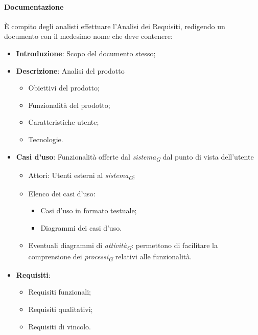 \paragraph{Documentazione}
È compito degli analisti effettuare l'Analisi dei Requisiti, redigendo un documento con il
medesimo nome che deve contenere:
\begin{itemize}
    \item \textbf{Introduzione}: Scopo del documento stesso;
    \item \textbf{Descrizione}: Analisi del prodotto
          \begin{itemize}
              \item Obiettivi del prodotto;
              \item Funzionalità del prodotto;
              \item Caratteristiche utente;
              \item Tecnologie.
          \end{itemize}
    \item \textbf{Casi d'uso}: Funzionalità offerte dal \textit{sistema}\textsubscript{\textit{G}} dal punto di vista dell'utente
        \begin{itemize}
            \item Attori: Utenti esterni al \textit{sistema}\textsubscript{\textit{G}};
            \item Elenco dei casi d'uso:
            \begin{itemize}
                \item Casi d'uso in formato testuale;
                \item Diagrammi dei casi d'uso.
            \end{itemize}  
            \item Eventuali diagrammi di \textit{attività}\textsubscript{\textit{G}}: permettono di facilitare la comprensione dei \textit{processi}\textsubscript{\textit{G}} relativi alle funzionalità.
        \end{itemize}
    \item \textbf{Requisiti}:
        \begin{itemize}
            \item Requisiti funzionali;
            \item Requisiti qualitativi;
            \item Requisiti di vincolo.
        \end{itemize}
\end{itemize}
